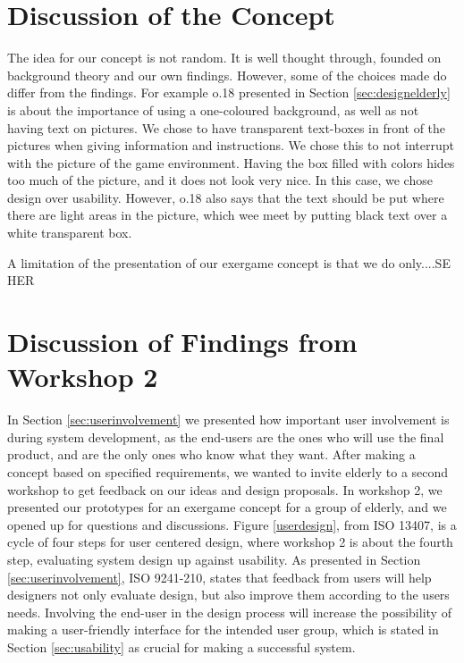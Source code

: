 \section{Discussion of the Concept}
\label{sec:discconcept}
The idea for our concept is not random. It is well thought through, founded on background theory and our own findings. However, some of the choices made do differ from the findings. For example o.18 presented in Section \ref{sec:designelderly} is about the importance of using a one-coloured background, as well as not having text on pictures. We chose to have transparent text-boxes in front of the pictures when giving information and instructions. We chose this to not interrupt with the picture of the game environment. Having the box filled with colors hides too much of the picture, and it does not look very nice. In this case, we chose design over usability. However, o.18 also says that the text should be put where there are light areas in the picture, which wee meet by putting black text over a white transparent box.    

A limitation of the presentation of our exergame concept is that we do only....SE HER

\section{Discussion of Findings from Workshop 2}
\label{sec:discfindings2}
In Section \ref{sec:userinvolvement} we presented how important user involvement is during system development, as the end-users are the ones who will use the final product, and are the only ones who know what they want. After making a concept based on specified requirements, we wanted to invite elderly to a second workshop to get feedback on our ideas and design proposals. In workshop 2, we presented our prototypes for an exergame concept for a group of elderly, and we opened up for questions and discussions. Figure \ref{userdesign}, from ISO 13407, is a cycle of four steps for user centered design, where workshop 2 is about the fourth step, evaluating system design up against usability. As presented in Section \ref{sec:userinvolvement}, ISO 9241-210, states that feedback from users will help designers not only evaluate design, but also improve them according to the users needs. Involving the end-user in the design process will increase the possibility of making a user-friendly interface for the intended user group, which is stated in Section \ref{sec:usability} as crucial for making a successful system. 


